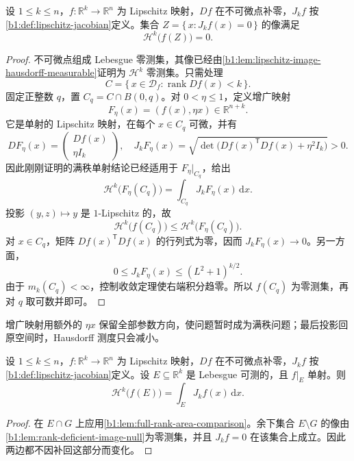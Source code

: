 \begin{lemma}\label{b1:lem:rank-deficient-image-null}
设 \(1\le k\le n\)，\(f:\mathbb R^k\to\mathbb R^n\) 为 Lipschitz 映射，\(Df\) 在不可微点补零，\(J_kf\) 按\cref{b1:def:lipschitz-jacobian}定义。集合 \(Z=\{\,x:J_kf(x)=0\,\}\) 的像满足
\[
 \mathcal H^k\bigl(f(Z)\bigr)=0.
\]
\end{lemma}
\begin{proof}
不可微点组成 Lebesgue 零测集，其像已经由\cref{b1:lem:lipschitz-image-hausdorff-measurable}证明为 \(\mathcal H^k\) 零测集。只需处理
\[
 C=\{\,x\in\mathcal D_f:\operatorname{rank}Df(x)<k\,\}.
\]
固定正整数 \(q\)，置 \(C_q=C\cap B(0,q)\)。对 \(0<\eta\leq1\)，定义增广映射
\[
 F_\eta(x)=(f(x),\eta x)\in\mathbb R^{n+k}.
\]
它是单射的 Lipschitz 映射，在每个 \(x\in C_q\) 可微，并有
\[
 DF_\eta(x)=
 \begin{pmatrix}Df(x)\\ \eta I_k\end{pmatrix},
 \quad
 J_kF_\eta(x)=
 \sqrt{\det\bigl(Df(x)^{\mathsf T}Df(x)+\eta^2I_k\bigr)}>0.
\]
因此刚刚证明的满秩单射结论已经适用于 \(F_\eta|_{C_q}\)，给出
\[
 \mathcal H^k\bigl(F_\eta(C_q)\bigr)
 =\int_{C_q}J_kF_\eta(x)\,\mathrm dx.
\]
投影 \((y,z)\mapsto y\) 是 \(1\)-Lipschitz 的，故
\[
 \mathcal H^k\bigl(f(C_q)\bigr)
 \leq\mathcal H^k\bigl(F_\eta(C_q)\bigr).
\]
对 \(x\in C_q\)，矩阵 \(Df(x)^{\mathsf T}Df(x)\) 的行列式为零，因而 \(J_kF_\eta(x)\to0\)。另一方面，
\[
 0\leq J_kF_\eta(x)\leq(L^2+1)^{k/2}.
\]
由于 \(m_k(C_q)<\infty\)，控制收敛定理使右端积分趋零。所以 \(f(C_q)\) 为零测集，再对 \(q\) 取可数并即可。
\end{proof}

增广映射用额外的 \(\eta x\) 保留全部参数方向，使问题暂时成为满秩问题；最后投影回原空间时，Hausdorff 测度只会减小。

\begin{theorem}[单射面积公式]\label{b1:thm:injective-area-formula}
设 \(1\le k\le n\)，\(f:\mathbb R^k\to\mathbb R^n\) 为 Lipschitz 映射，\(Df\) 在不可微点补零，\(J_kf\) 按\cref{b1:def:lipschitz-jacobian}定义。设 \(E\subseteq\mathbb R^k\) 是 Lebesgue 可测的，且 \(f|_E\) 单射。则
\[
 \mathcal H^k\bigl(f(E)\bigr)=\int_EJ_kf(x)\,\mathrm dx.
\]
\end{theorem}
\begin{proof}
在 \(E\cap G\) 上应用\cref{b1:lem:full-rank-area-comparison}。余下集合 \(E\setminus G\) 的像由\cref{b1:lem:rank-deficient-image-null}为零测集，并且 \(J_kf=0\) 在该集合上成立。因此两边都不因补回这部分而变化。
\end{proof}

